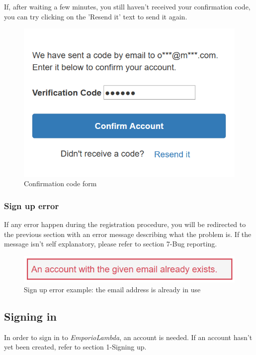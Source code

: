 If, after waiting a few minutes, you still haven't received your confirmation code, you can try clicking on the 'Resend it' text to send it again.

\begin{figure}[H]
\centering
\includegraphics[scale=0.6]{res/Immagini/RegisterCode}
\caption{Confirmation code form}
\end{figure}

\subsubsection{Sign up error}
If any error happen during the registration procedure, you will be redirected to the previous section with an error message describing what the problem is. If the message isn't self explanatory, please refer to section 7-Bug reporting.

\begin{figure}[H]
\centering
\includegraphics[scale=0.6]{res/Immagini/RegisterError}
\caption{Sign up error example: the email address is already in use}
\end{figure}

\subsection{Signing in}
In order to sign in to \textit{EmporioLambda}, an account is needed. If an account hasn't yet been created, refer to section 1-Signing up.

